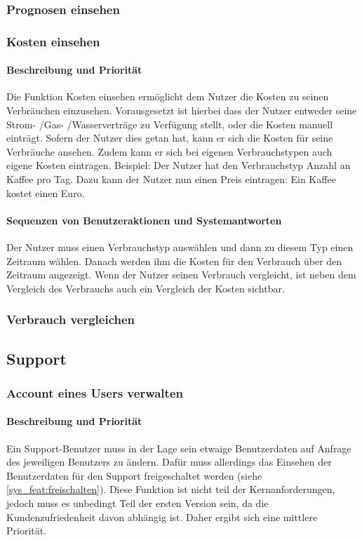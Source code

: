 \subsubsection{Prognosen einsehen}

\subsubsection{Kosten einsehen}
\paragraph{Beschreibung und Priorität}
Die Funktion Kosten einsehen ermöglicht dem Nutzer die Kosten zu seinen Verbräuchen einzusehen. Vorausgesetzt ist hierbei dass der Nutzer entweder seine Strom- /Gas- /Wasserverträge zu Verfügung stellt, oder die Kosten manuell einträgt. Sofern der Nutzer dies getan hat, kann er sich die Kosten für seine Verbräuche ansehen. Zudem kann er sich bei eigenen Verbrauchstypen auch eigene Kosten eintragen. Beispiel: Der Nutzer hat den Verbrauchstyp Anzahl an Kaffee pro Tag. Dazu kann der Nutzer nun einen Preis eintragen: Ein Kaffee kostet einen Euro. 
\paragraph{Sequenzen von Benutzeraktionen und Systemantworten}
Der Nutzer muss einen Verbrauchstyp auswählen und dann zu diesem Typ einen Zeitraum wählen. Danach werden ihm die Kosten für den Verbrauch über den Zeitraum angezeigt. Wenn der Nutzer seinen Verbrauch vergleicht, ist neben dem Vergleich des Verbrauchs auch ein Vergleich der Kosten sichtbar. 

\subsubsection{Verbrauch vergleichen}


\subsection{Support}
\subsubsection{Account eines Users verwalten}
\paragraph{Beschreibung und Priorität}
Ein Support-Benutzer muss in der Lage sein etwaige Benutzerdaten auf Anfrage des jeweiligen Benutzers zu ändern. Dafür muss allerdings das Einsehen der Benutzerdaten für den Support freigeschaltet werden (siehe \ref{sys_feat:freischalten}). Diese Funktion ist nicht teil der Kernanforderungen, jedoch muss es unbedingt Teil der ersten Version sein, da die Kundenzufriedenheit davon abhängig ist. Daher ergibt sich eine mittlere Priorität.
